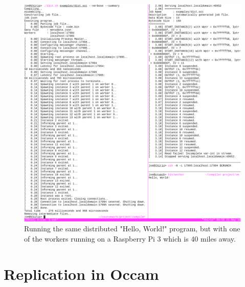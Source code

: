 \documentclass[12pt, twoside]{report}
\begin{document}
    \begin{figure}[H]
      \includegraphics[width=\textwidth]{images/distributed_pi}
      \caption{
        Running the same distributed "Hello, World!" program, but with one of
        the workers running on a Raspberry Pi 3 which is 40 miles away.
      }
    \end{figure}
  
  \chapter{Replication in Occam} \label{adx-occam}
    

  \clearpage
    
\end{document}
